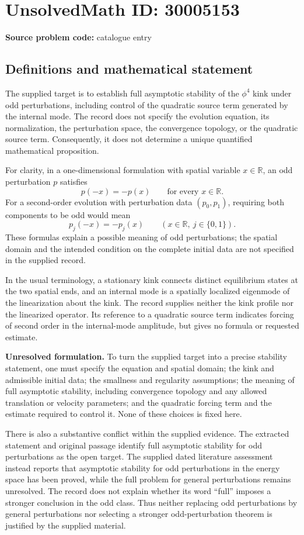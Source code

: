 \documentclass[11pt]{article}
\newcommand{\R}{\mathbb{R}}
\begin{document}
\section*{UnsolvedMath ID: 30005153}
\textbf{Source problem code:} catalogue entry
\subsection{Definitions and mathematical statement}
The supplied target is to establish full asymptotic stability of the $\phi^4$ kink under odd perturbations, including control of the quadratic source term generated by the internal mode. The record does not specify the evolution equation, its normalization, the perturbation space, the convergence topology, or the quadratic source term. Consequently, it does not determine a unique quantified mathematical proposition.

For clarity, in a one-dimensional formulation with spatial variable $x\in\R$, an odd perturbation $p$ satisfies
\[
 p(-x)=-p(x)\qquad\text{for every }x\in\R.
\]
For a second-order evolution with perturbation data $(p_0,p_1)$, requiring both components to be odd would mean
\[
 p_j(-x)=-p_j(x)\qquad(x\in\R,\ j\in\{0,1\}).
\]
These formulas explain a possible meaning of odd perturbations; the spatial domain and the intended condition on the complete initial data are not specified in the supplied record.

In the usual terminology, a stationary kink connects distinct equilibrium states at the two spatial ends, and an internal mode is a spatially localized eigenmode of the linearization about the kink. The record supplies neither the kink profile nor the linearized operator. Its reference to a quadratic source term indicates forcing of second order in the internal-mode amplitude, but gives no formula or requested estimate.

\textbf{Unresolved formulation.} To turn the supplied target into a precise stability statement, one must specify the equation and spatial domain; the kink and admissible initial data; the smallness and regularity assumptions; the meaning of full asymptotic stability, including convergence topology and any allowed translation or velocity parameters; and the quadratic forcing term and the estimate required to control it. None of these choices is fixed here.

There is also a substantive conflict within the supplied evidence. The extracted statement and original passage identify full asymptotic stability for odd perturbations as the open target. The supplied dated literature assessment instead reports that asymptotic stability for odd perturbations in the energy space has been proved, while the full problem for general perturbations remains unresolved. The record does not explain whether its word ``full'' imposes a stronger conclusion in the odd class. Thus neither replacing odd perturbations by general perturbations nor selecting a stronger odd-perturbation theorem is justified by the supplied material.
\end{document}
